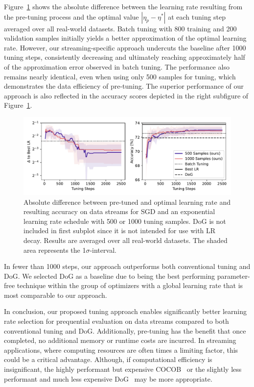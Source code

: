 \documentclass[runningheads]{llncs}
\begin{document}
Figure~\ref{fig:pretune_lr_accuracy} shows the absolute difference between the learning rate resulting from the pre-tuning process and the optimal value $|\eta_p - \eta^*|$ at each tuning step averaged over all real-world datasets.
Batch tuning with 800 training and 200 validation samples initially yields a better approximation of the optimal learning rate. However, our streaming-specific approach undercuts the baseline after 1000 tuning steps, consistently decreasing and ultimately reaching approximately half of the approximation error observed in batch tuning.
The performance also remains nearly identical, even when using only 500 samples for tuning, which demonstrates the data efficiency of pre-tuning.
The superior performance of our approach is also reflected in the accuracy scores depicted in the right subfigure of Figure~\ref{fig:pretune_lr_accuracy}.
\begin{figure}[hb]
	\centering
	\includegraphics[width=\textwidth]{figures/pretune_1x64_acc_lr_exp_schedule.pdf}
	\caption{Absolute difference between pre-tuned and optimal learning rate and resulting accuracy on data streams for SGD and an exponential learning rate schedule with 500 or 1000 tuning samples. DoG is not included in first subplot since it is not intended for use with LR decay. Results are averaged over all real-world datasets. The shaded area represents the 1$\sigma$-interval.}\label{fig:pretune_lr_accuracy}
\end{figure}
In fewer than 1000 steps, our approach outperforms both conventional tuning and DoG. 
We selected DoG as a baseline due to being the best performing parameter-free technique within the group of optimizers with a global learning rate that is most comparable to our approach.

In conclusion, our proposed tuning approach enables significantly better learning rate selection for prequential evaluation on data streams compared to both conventional tuning and DoG.
Additionally, pre-tuning has the benefit that once completed, no additional memory or runtime costs are incurred.
In streaming applications, where computing resources are often times a limiting factor, this could be a critical advantage.
Although, if computational efficiency is insignificant, the highly performant but expensive COCOB~\cite{orabonaTrainingDeepNetworks2017} or the slightly less performant and much less expensive DoG~\cite{ivgiDoGSGDBest2023} may be more appropriate.
\end{document}
